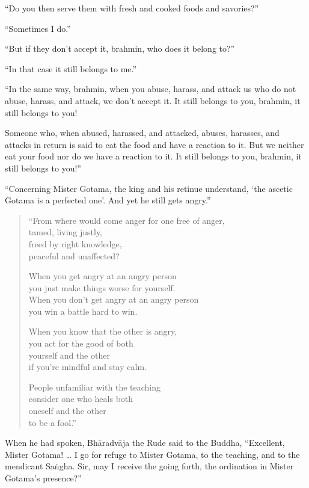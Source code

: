 \documentclass[12pt,openany]{book}%
\begin{document}
“Do you then serve them with fresh and cooked foods and savories?” 

“Sometimes I do.” 

“But if they don’t accept it, brahmin, who does it belong to?” 

“In that case it still belongs to me.” 

“In the same way, brahmin, when you abuse, harass, and attack us who do not abuse, harass, and attack, we don’t accept it. It still belongs to you, brahmin, it still belongs to you! 

Someone who, when abused, harassed, and attacked, abuses, harasses, and attacks in return is said to eat the food and have a reaction to it. But we neither eat your food nor do we have a reaction to it. It still belongs to you, brahmin, it still belongs to you!” 

“Concerning Mister Gotama, the king and his retinue understand, ‘the ascetic Gotama is a perfected one’. And yet he still gets angry.” 

\begin{verse}%
“From where would come anger for one free of anger, \\
tamed, living justly, \\
freed by right knowledge, \\
peaceful and unaffected? 

When you get angry at an angry person \\
you just make things worse for yourself. \\
When you don’t get angry at an angry person \\
you win a battle hard to win. 

When you know that the other is angry, \\
you act for the good of both \\
yourself and the other \\
if you’re mindful and stay calm. 

People unfamiliar with the teaching \\
consider one who heals both \\
oneself and the other \\
to be a fool.” 

%
\end{verse}

When he had spoken, \textsanskrit{Bhāradvāja} the Rude said to the Buddha, “Excellent, Mister Gotama! … I go for refuge to Mister Gotama, to the teaching, and to the mendicant \textsanskrit{Saṅgha}. Sir, may I receive the going forth, the ordination in Mister Gotama’s presence?” 
\end{document}
